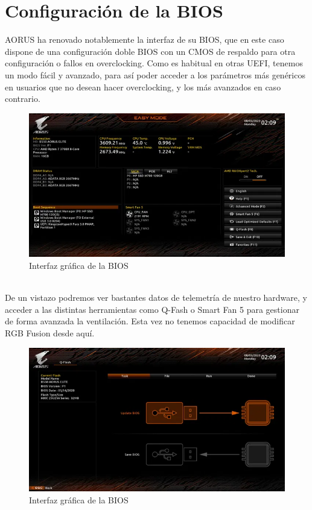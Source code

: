 \documentclass{article}
\begin{document}
     \newpage   
      \section{Configuración de la BIOS}
        AORUS ha renovado notablemente la interfaz de su BIOS, que en este caso dispone de una configuración doble BIOS con un CMOS de respaldo para otra configuración o fallos en overclocking. Como es habitual en otras UEFI, tenemos un modo fácil y 
        avanzado, para así poder acceder a los parámetros más genéricos en usuarios que no desean hacer overclocking, y los más avanzados en caso contrario.\\
        \begin{figure}[h]
          \centering
          \includegraphics[scale = 0.5]{img/BIOS1.png}
          \caption{Interfaz gráfica de la BIOS}
        \end{figure}\\
        De un vistazo podremos ver bastantes datos de telemetría de nuestro hardware, y acceder a las distintas herramientas como Q-Fash o Smart Fan 5 para gestionar de forma avanzada la ventilación. Esta vez no tenemos capacidad de modificar RGB Fusion 
        desde aquí.
        \begin{figure}[h]
          \centering
          \includegraphics[scale = 0.5]{img/BIOS2.png}
          \caption{Interfaz gráfica de la BIOS}
        \end{figure}
\end{document}
